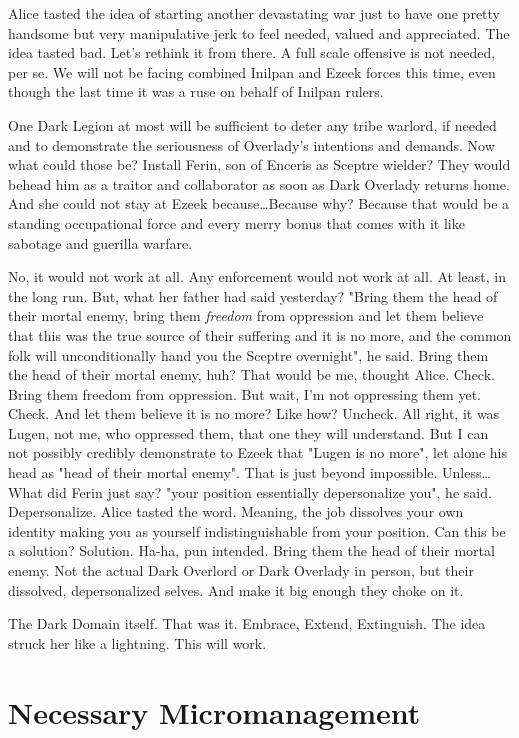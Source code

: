 Alice tasted the idea of starting another devastating war just to have one pretty handsome but very manipulative jerk to feel needed, valued and appreciated. The idea tasted bad. Let's rethink it from there. A full scale offensive is not needed, per se. We will not be facing combined Inilpan and Ezeek forces this time, even though the last time it was a ruse on behalf of Inilpan rulers.

One Dark Legion at most will be sufficient to deter any tribe warlord, if needed and to demonstrate the seriousness of Overlady's intentions and demands. Now what could those be? Install Ferin, son of Enceris as Sceptre wielder? They would behead him as a traitor and collaborator as soon as Dark Overlady returns home. And she could not stay at Ezeek because\dots Because why? Because that would be a standing occupational force and every merry bonus that comes with it like sabotage and guerilla warfare.

No, it would not work at all. Any enforcement would not work at all. At least, in the long run. But, what her father had said yesterday? "Bring them the head of their mortal enemy, bring them \textit{freedom} from oppression and let them believe that this was the true source of their suffering and it is no more, and the common folk will unconditionally hand you the Sceptre overnight", he said. Bring them the head of their mortal enemy, huh? That would be me, thought Alice. Check. Bring them freedom from oppression. But wait, I'm not oppressing them yet. Check. And let them believe it is no more? Like how? Uncheck. All right, it was Lugen, not me, who oppressed them, that one they will understand. But I can not possibly credibly demonstrate to Ezeek that "Lugen is no more", let alone his head as "head of their mortal enemy". That is just beyond impossible. Unless\dots What did Ferin just say? "your position essentially depersonalize you", he said. Depersonalize. Alice tasted the word. Meaning, the job dissolves your own identity making you as yourself indistinguishable from your position. Can this be a solution? Solution. Ha-ha, pun intended. Bring them the head of their mortal enemy. Not the actual Dark Overlord or Dark Overlady in person, but their dissolved, depersonalized selves. And make it big enough they choke on it. 

The Dark Domain itself. That was it. Embrace, Extend, Extinguish. The idea struck her like a lightning. This will work.

\section{Necessary Micromanagement}

